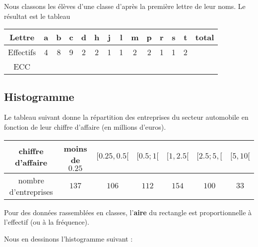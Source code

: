 Nous classons les élèves d'une classe d'après la première lettre de leur noms. Le résultat est le tableau
\begin{center}
\begin{tabular}[]{|c||c|c|c|c|c|c|c|c|c|c|c|c|c|}
        \hline
        Lettre&a&b&c&d&h&j&l&m&p&r&s&t&total\\
        \hline\hline
        Effectifs&4&8&9&2&2&1&1&2&2&1&1&2&\\
        \hline
        ECC&&&&&&&&&&&&&\\
        \hline
\end{tabular}
\end{center}

   



\subsection{Histogramme}

Le tableau suivant donne la répartition des entreprises du secteur automobile en fonction de leur chiffre d'affaire (en millions d'euros).

\begin{center}
    \begin{tabular}{|c||c|c|c|c|c|c|}
        \hline
        chiffre d'affaire&moins de \( 0.25\)&\( \mathopen[ 0.25 ,0.5 [\)&$\mathopen[ 0.5;1  [$&$\mathopen[ 1 , 2.5 [$&$\mathopen[ 2.5;5 ,  [$&$\mathopen[ 5 , 10 [$\\
            \hline\hline
            nombre d'entreprises&\( 137\)&\( 106\)&\( 112\)&$154$&\( 100\)&\( 33\)\\
            \hline
    \end{tabular}
\end{center}

\begin{Aretenir}
Pour des données rassemblées en classes, l'\textbf{aire} du rectangle est proportionnelle à l'effectif (ou à la fréquence). 
\end{Aretenir}

Nous en dessinons l'histogramme suivant :
\begin{center}
   
\end{center}


